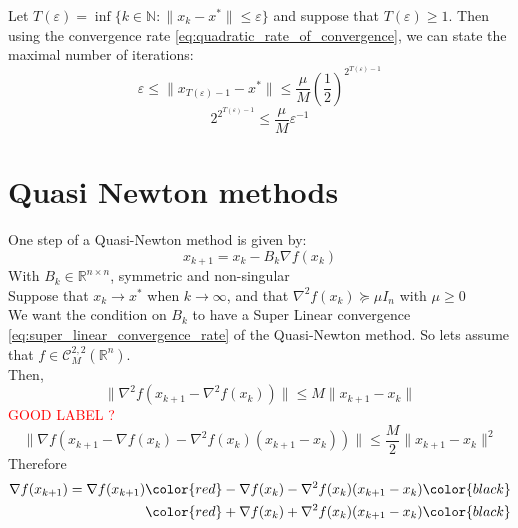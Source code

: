\documentclass[12pt, openany]{report}
\newcommand{\R}{\mathbb{R}}
\newcommand{\C}{\mathcal{C}}
\newcommand{\N}{\mathbb{N}}
\theoremstyle{definition}
\begin{document}
Let $T(\varepsilon) = \inf\{k\in\N: \|x_k-x^*\|\leq \varepsilon\}$ and suppose that $T(\varepsilon) \geq 1$. Then using the convergence rate \eqref{eq:quadratic_rate_of_convergence}, we can state the maximal number of iterations:
\begin{equation}
	\varepsilon \leq \|x_{T(\varepsilon)-1}-x^*\| \leq \frac{\mu}{M} \left(\frac{1}{2}\right)^{2^{T(\varepsilon)-1}}
\end{equation}
\begin{equation}
	2^{2^{T(\varepsilon)-1}} \leq \frac{\mu}{M} \varepsilon^{-1}
\end{equation}
\color{red}
\color{black}

\section{Quasi Newton methods}
One step of a Quasi-Newton method is given by:
\begin{equation}\label{eq:quasi_newton}
	x_{k+1} = x_k -B_k \nabla f(x_k)
\end{equation}
With $B_k \in \R^{n\times n}$, symmetric and non-singular\\
Suppose that $x_k \to x^*$ when $k \to \infty$, and that $\nabla^2f(x_k) \succeq \mu I_n$ with $\mu \geq 0$\\
We want the condition on $B_k$ to have a Super Linear convergence \eqref{eq:super_linear_convergence_rate} of the Quasi-Newton method. So lets assume that $f \in \C_M^{2,2}(\R^n)$.\\
Then,
\begin{equation}\label{eq:bound_hessian_difference}
	\|\nabla^2f(x_{k+1}-\nabla^2f(x_k))\| \leq M \|x_{k+1}-x_k\|
\end{equation}
\textcolor{red}{GOOD LABEL ?}
\begin{equation}\label{eq:M_smoothness}
	\|\nabla f(x_{k+1}-\nabla f(x_k)-\nabla^2 f(x_k)(x_{k+1}-x_k))\| \leq \frac{M}{2} \|x_{k+1}-x_k\|^2
\end{equation}
Therefore
\begin{equation}
	\begin{aligned}
		\nabla f(x_{k+1}) = \nabla f(x_{k+1}) &  \color{red}  - \nabla f(x_k) - \nabla^2 f(x_k) (x_{k+1}-x_k)  \color{black} \\ &  \color{red} + \nabla f(x_k) + \nabla^2 f(x_k) (x_{k+1}-x_k) \color{black}
	\end{aligned}
\end{equation}
\end{document}
